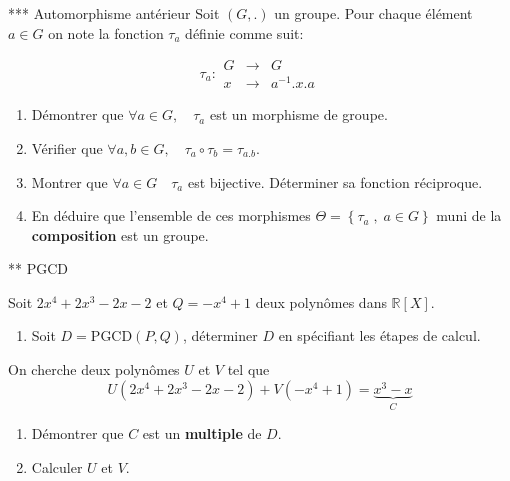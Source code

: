 \documentclass[exam]{cs188}
\begin{document}
\begin{problem}[4]{*** Automorphisme antérieur}
  Soit $(G, .) $ un groupe. Pour chaque élément $a \in G$ on note la fonction
  $\tau_a$ définie comme suit:

  \begin{equation}
    \label{eq:tau}
    \tau_a: \begin{array}{lll}
      G&\longrightarrow  & G\\
      x&\longrightarrow & a^{-1}.x.a
    \end{array}
  \end{equation}

  \begin{enumerate}
    \item Démontrer que $\forall a \in G, \quad \tau_a$ est un morphisme de
      groupe.
    \item Vérifier que $\forall a, b \in G,\quad \tau_a\circ\tau_b=\tau_{a.b}$.

    \item Montrer que $\forall a\in G \quad \tau_a$ est bijective. Déterminer sa
      fonction réciproque.
    \item En déduire que l'ensemble de ces morphismes $\Theta=\left\{\tau_a\;,\;
      a\in G\right\}$ muni de la \textbf{composition}  est un groupe.
  \end{enumerate}

\end{problem}
\begin{problem}[]{** PGCD}
  \begin{question}[2]
  Soit $2x^4+2x^3-2x-2$ et $Q=-x^4+1$ deux polynômes dans $\mathbb{R}[X]$.

  \begin{enumerate}
    \item Soit $D= \text{PGCD}(P,Q)$,  déterminer $D$ en spécifiant les étapes de calcul.
  \end{enumerate}
\end{question}

\begin{question}[2]
  On cherche deux polynômes $U$ et $V$ tel que 
  \begin{equation}
    U(2x^4+2x^3-2x-2) + V(-x^4+1) = \underbrace{x^3-x}_{C} 
  \end{equation}
  \begin{enumerate}
    \item Démontrer que $C$ est un \textbf{multiple} de $D$.

    \item Calculer $U$ et $V$.
  \end{enumerate}
 \end{question} 
\end{problem}
\end{document}
